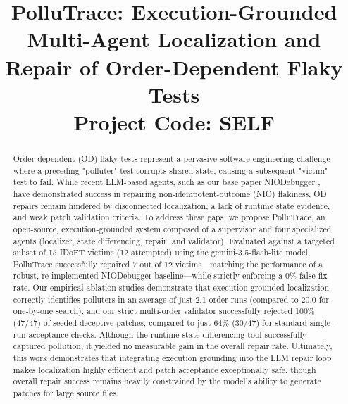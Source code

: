 \documentclass[conference]{IEEEtran}
\begin{document}
\title{PolluTrace: Execution-Grounded Multi-Agent Localization and Repair of Order-Dependent Flaky Tests\\
\large Project Code: SELF}

\author{
\and
{}
\and
{}
}

\maketitle

\begin{abstract}
Order-dependent (OD) flaky tests represent a pervasive software engineering challenge where a preceding "polluter" test corrupts shared state, causing a subsequent "victim" test to fail. While recent LLM-based agents, such as our base paper NIODebugger \cite{ke2025niodebugger}, have demonstrated success in repairing non-idempotent-outcome (NIO) flakiness, OD repairs remain hindered by disconnected localization, a lack of runtime state evidence, and weak patch validation criteria. To address these gaps, we propose PolluTrace, an open-source, execution-grounded system composed of a supervisor and four specialized agents (localizer, state differencing, repair, and validator). Evaluated against a targeted subset of 15 IDoFT victims (12 attempted) using the gemini-3.5-flash-lite model, PolluTrace successfully repaired 7 out of 12 victims—matching the performance of a robust, re-implemented NIODebugger baseline—while strictly enforcing a 0\% false-fix rate. Our empirical ablation studies demonstrate that execution-grounded localization correctly identifies polluters in an average of just 2.1 order runs (compared to 20.0 for one-by-one search), and our strict multi-order validator successfully rejected 100\% (47/47) of seeded deceptive patches, compared to just 64\% (30/47) for standard single-run acceptance checks. Although the runtime state differencing tool successfully captured pollution, it yielded no measurable gain in the overall repair rate. Ultimately, this work demonstrates that integrating execution grounding into the LLM repair loop makes localization highly efficient and patch acceptance exceptionally safe, though overall repair success remains heavily constrained by the model's ability to generate patches for large source files.
\end{abstract}
\end{document}
